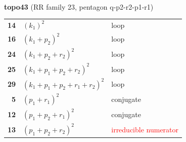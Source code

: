 \documentclass[10pt]{article}
\begin{document}
\begin{minipage}[t]{0.48\textwidth}
{}\\[2mm]\textbf{topo43} (RR family 23, pentagon q-p2-r2-p1-r1)\\[2pt]{\footnotesize\begin{tabular}{@{}r@{\ \ }l@{\ \ }l@{}}\textbf{14} & $(k_1)^2$ & loop\\
\textbf{16} & $(k_1+p_2)^2$ & loop\\
\textbf{24} & $(k_1+p_2+r_2)^2$ & loop\\
\textbf{25} & $(k_1+p_1+p_2+r_2)^2$ & loop\\
\textbf{29} & $(k_1+p_1+p_2+r_1+r_2)^2$ & loop\\
\textbf{5} & $(p_1+r_1)^2$ & conjugate\\
\textbf{12} & $(p_1+p_2+r_1)^2$ & conjugate\\
\textbf{13} & $(p_1+p_2+r_2)^2$ & \textcolor{red}{irreducible numerator}\\\end{tabular}}\end{minipage}\hfill%
\end{document}
